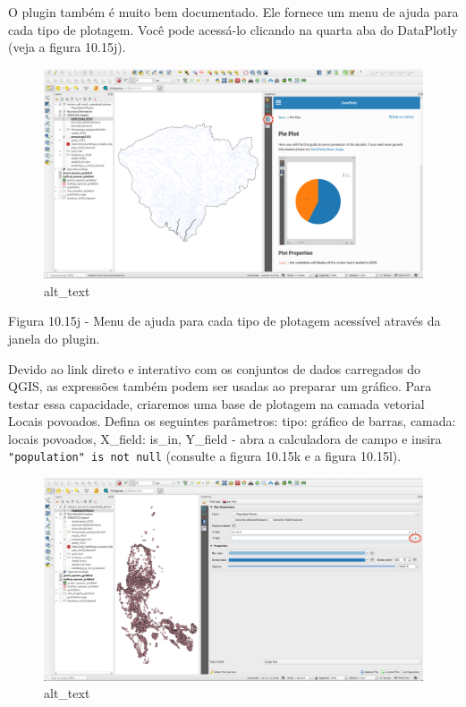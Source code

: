 \documentclass[
  portuguese,
]{krantz}
\begin{document}
O plugin também é muito bem documentado. Ele fornece um menu de ajuda para cada tipo de plotagem. Você pode acessá-lo clicando na quarta aba do DataPlotly (veja a figura 10.15j).

\begin{figure}
\centering
\includegraphics{media/modulo10/fig1015_j.png}
\caption{alt\_text}
\end{figure}

Figura 10.15j - Menu de ajuda para cada tipo de plotagem acessível através da janela do plugin.

Devido ao link direto e interativo com os conjuntos de dados carregados do QGIS, as expressões também podem ser usadas ao preparar um gráfico. Para testar essa capacidade, criaremos uma base de plotagem na camada vetorial Locais povoados. Defina os seguintes parâmetros: tipo: gráfico de barras, camada: locais povoados, X\_field: is\_in, Y\_field - abra a calculadora de campo e insira \texttt{"population"\ is\ not\ null} (consulte a figura 10.15k e a figura 10.15l).

\begin{figure}
\centering
\includegraphics{media/modulo10/fig1015_k.png}
\caption{alt\_text}
\end{figure}
\end{document}
